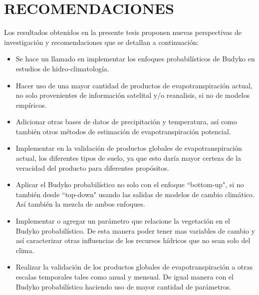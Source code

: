 \documentclass[12pt]{article}
\begin{document}
\clearpage
\vspace*{0.5mm}
\section{RECOMENDACIONES}

Los resultados obtenidos en la presente tesis proponen nuevas perspectivas de investigación y recomendaciones que se detallan a continuación:

\begin{itemize}

    \item Se hace un llamado en implementar los enfoques probabilísticos de Budyko en estudios de hidro-climatología.
    
    \item Hacer uso de una mayor cantidad de productos de evapotranspiración actual, no solo provenientes de información satelital y/o reanalisis, si no de modelos empíricos.
    
    \item Adicionar otras bases de datos de precipitación y temperatura, así como también otros métodos de estimación de evapotranspiración potencial.
    
    \item Implementar en la validación de productos globales de evapotranspiración actual, los diferentes tipos de suelo, ya que esto daría mayor certeza de la veracidad del producto para diferentes propósitos.
    
    \item Aplicar el Budyko probabilístico no solo con el enfoque “bottom-up", si no también desde “top-down" usando las salidas de modelos de cambio climático. Así también la mezcla de ambos enfoques.

    \item Implementar o agregar un parámetro que relacione la vegetación en el Budyko probabilístico. De esta manera poder tener mas variables de cambio y así caracterizar otras influencias de los recursos hídricos que no sean solo del clima.
    
    \item Realizar la validación de los productos globales de evapotranspiración a otras escalas temporales tales como anual y mensual. De igual manera con el Budyko probabilístico haciendo uso de mayor cantidad de parámetros.
    
    
\end{itemize}


\clearpage
\vspace*{0.5mm}
\end{document}
